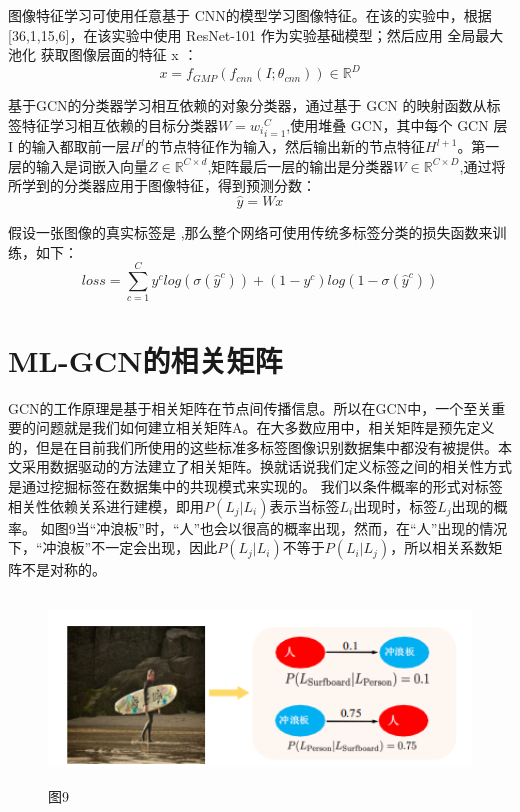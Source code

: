 图像特征学习可使用任意基于 CNN的模型学习图像特征。在该的实验中，根据[36,1,15,6]，在该实验中使用 ResNet-101 作为实验基础模型；然后应用 全局最大池化 获取图像层面的特征 x ：
\begin{equation}
\label{dscNoStgProof0}
x = f_{GMP}(f_{cnn}(I;\theta_{cnn}))\in \mathbb{R}^D
\end{equation}

基于GCN的分类器学习相互依赖的对象分类器，通过基于 GCN 的映射函数从标签特征学习相互依赖的目标分类器$W={w_i}_{i=1}^C$,使用堆叠 GCN，其中每个 GCN 层 I 的输入都取前一层$H^l$的节点特征作为输入，然后输出新的节点特征$H^{l+1}$。第一层的输入是词嵌入向量$Z\in \mathbb{R}^{C\times d}$,矩阵最后一层的输出是分类器$W\in \mathbb{R}^{C\times D}$,通过将所学到的分类器应用于图像特征，得到预测分数：
\begin{equation}
\label{dscNoStgProof0}
\hat{y} = Wx
\end{equation}

假设一张图像的真实标签是 ,那么整个网络可使用传统多标签分类的损失函数来训练，如下：
\begin{equation}
\label{dscNoStgProof0}
loss = \sum_{c=1}^C y^c log(\sigma(\hat{y}^c))+(1-y^c)log(1-\sigma(\hat{y}^c))
\end{equation}

\section{ML-GCN的相关矩阵}
GCN的工作原理是基于相关矩阵在节点间传播信息。所以在GCN中，一个至关重要的问题就是我们如何建立相关矩阵A。在大多数应用中，相关矩阵是预先定义的，但是在目前我们所使用的这些标准多标签图像识别数据集中都没有被提供。本文采用数据驱动的方法建立了相关矩阵。换就话说我们定义标签之间的相关性方式是通过挖掘标签在数据集中的共现模式来实现的。
我们以条件概率的形式对标签相关性依赖关系进行建模，即用$P(L_j|L_i)$表示当标签$L_i$出现时，标签$L_j$出现的概率。 如图9当“冲浪板”时，“人”也会以很高的概率出现，然而，在“人”出现的情况下，“冲浪板”不一定会出现，因此$P(L_j|L_i)$不等于$P(L_i|L_j)$，所以相关系数矩阵不是对称的。

\begin{figure}[htbp!]
	\centering
	\includegraphics[width=12cm, height=5cm]{figures/p3-2.png}
	\caption{图9}\label{fig:pic9}
	\vspace{-1em}
\end{figure}


